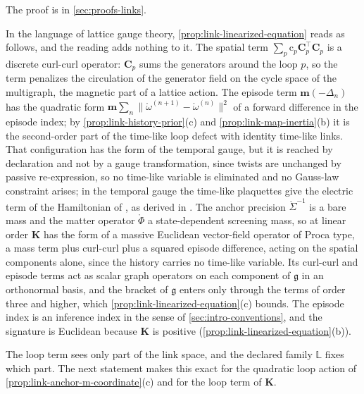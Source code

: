 The proof is in \cref{sec:proofs-links}.

In the language of lattice gauge theory, \cref{prop:link-linearized-equation} reads as follows, and
the reading adds nothing to it. The spatial term $\sum_p\mathrm c_p\mathbf C_p^\top\mathbf C_p$ is a
discrete curl-curl operator: $\mathbf C_p$ sums the generators around the loop $p$, so the term
penalizes the circulation of the generator field on the cycle space of the multigraph, the magnetic
part of a lattice action. The episode term $\mathbf m(-\Delta_n)$ has the quadratic form
$\mathbf m\sum_n\lVert\mathring\omega^{(n+1)}-\mathring\omega^{(n)}\rVert^2$ of a forward difference in the
episode index; by \cref{prop:link-history-prior}(c) and \cref{prop:link-map-inertia}(b) it is the
second-order part of the time-like loop defect with identity time-like links. That configuration has
the form of the temporal gauge, but it is reached by declaration and not by a gauge transformation,
since twists are unchanged by passive re-expression, so no time-like variable is eliminated and no Gauss-law constraint
arises; in the temporal gauge the time-like plaquettes give the electric term of the Hamiltonian of
\citet{KogutSusskind1975}, as derived in \citet[Ch.~15, Eq.~(15.41)]{Creutz1983}. The anchor
precision $\mathring\Sigma^{-1}$ is a bare mass and the matter operator $\mathring\Phi$ a state-dependent
screening mass, so at linear order $\mathbf K$ has the form of a massive Euclidean vector-field
operator of Proca type, a mass term plus curl-curl plus a squared episode difference, acting on the
spatial components alone, since the history carries no time-like variable. Its curl-curl and episode
terms act as scalar graph operators on each component of $\mathfrak g$ in an orthonormal basis, and
the bracket of $\mathfrak g$ enters only through the terms of order three and higher, which
\cref{prop:link-linearized-equation}(c) bounds. The episode index is an
inference index in the sense of \cref{sec:intro-conventions}, and the signature is Euclidean
because $\mathbf K$ is positive (\cref{prop:link-linearized-equation}(b)).

The loop term sees only part of the link space, and the declared family $\mathbb L$ fixes which part.
The next statement makes this exact for the quadratic loop action of
\cref{prop:link-anchor-m-coordinate}(c) and for the loop term of $\mathbf K$.

